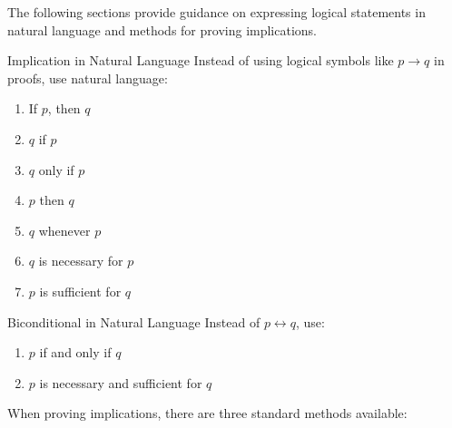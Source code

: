 The following sections provide guidance on expressing logical statements 
in natural language and methods for proving implications.

\begin{define}{Implication in Natural Language}
  \label{def:implication-natural-language} 
  Instead of using logical symbols like $p \to q$ in proofs, use natural language:
  \begin{enumerate}
    \item If $p$, then $q$
    \item $q$ if $p$
    \item $q$ only if $p$
    \item $p$ then $q$
    \item $q$ whenever $p$
    \item $q$ is necessary for $p$
    \item $p$ is sufficient for $q$
  \end{enumerate}
\end{define}

\begin{define}{Biconditional in Natural Language}
  \label{def:biconditional-natural-language} 
  Instead of $p \leftrightarrow q$, use:
  \begin{enumerate}
    \item $p$ if and only if $q$
    \item $p$ is necessary and sufficient for $q$
  \end{enumerate}
\end{define}


\newpage 

When proving implications, there are three standard methods available:

